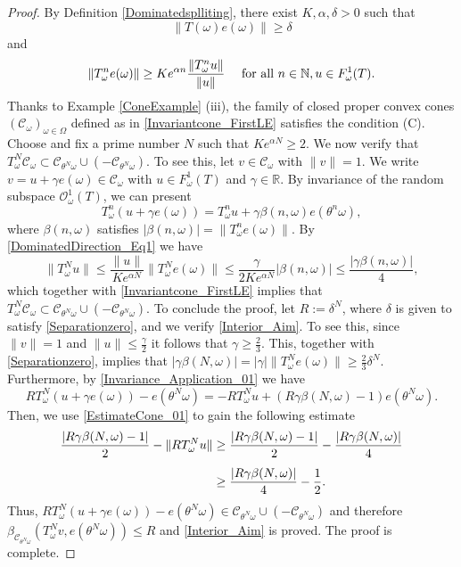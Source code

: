 \documentclass[pdflatex,sn-mathphys-num]{sn-jnl}%
\theoremstyle{thmstyleone}%
\theoremstyle{thmstyletwo}%
\theoremstyle{thmstylethree}%
\newcommand{\N}{\mathbb{N}}
\newcommand{\R}{\mathbb{R}}
\newcommand{\cC}{\mathcal{C}}
\numberwithin{equation}{section}
\begin{document}
\begin{proof}
By Definition \ref{Dominatedsplliting}, there exist $K,\alpha,\delta>0$ such that 
\begin{equation}\label{Separationzero}
\|T(\omega)e(\omega)\|\geq \delta 
\end{equation}
and 
\begin{equation}\label{DominatedDirection_Eq1}
\|T^n_{\omega}e(\omega)\|\geq   Ke^{\alpha n}  \frac{\|T_{\omega}^n u\|}{\|u\|} \quad \hbox{ for all } n\in\N, u\in F^1_{\omega}(T).
\end{equation}
%
%
Thanks to Example \eqref{ConeExample} (iii), the family of closed proper convex cones $(\cC_{\omega})_{\omega\in\Omega}$ defined as in \eqref{Invariantcone_FirstLE} satisfies the condition (C). Choose and fix a prime number $N$ such that $Ke^{\alpha N}\geq 2 $. We now verify that $T^N_{\omega}\mathcal C_{\omega}\subset \mathcal C_{\theta^N \omega}\cup (-\mathcal C_{\theta^N\omega})$. To see this,  let $v\in \cC_{\omega}$ with $\|v\|=1$. We write $v=u+\gamma e(\omega)\in\cC_{\omega}$ with $u\in F^1_{\omega}(T)$  and $\gamma\in\R$. By invariance of the random subspace $\mathcal O^1_{\omega}(T)$, we can present 
\begin{equation}\label{Invariance_Application_01}
T^n_{\omega}(u+\gamma e(\omega))
=T^n_{\omega} u + \gamma \beta(n,\omega) e(\theta^n\omega),
\end{equation}
where $\beta(n,\omega)$ satisfies $|\beta(n,\omega)|=\|T^n_{\omega}e(\omega)\|$. By \eqref{DominatedDirection_Eq1} we have 
\begin{equation}\label{EstimateCone_01}
\|T^N_{\omega} u\| \leq \frac{\|u\|}{Ke^{\alpha N}}\|T^N_{\omega}e(\omega)\|
\leq 
\frac{\gamma}{2Ke^{\alpha N}}|\beta(n,\omega)|\leq \frac{|\gamma \beta(n,\omega)|}{4},
\end{equation}
which together with \eqref{Invariantcone_FirstLE} implies that $T^N_{\omega}\cC_{\omega} \subset \mathcal C_{\theta^N \omega}\cup (-\mathcal C_{\theta^N\omega})$. To conclude the proof, let $R:=\delta^N$, where $\delta$ is given to satisfy \eqref{Separationzero},  and we verify \eqref{Interior_Aim}. To see this, since  $\|v\|=1$ and $\|u\|\leq \frac{\gamma}{2}$ it follows that $\gamma\geq \frac{2}{3}$. This, together with \eqref{Separationzero}, implies that 
$|\gamma \beta(N,\omega)|=|\gamma|\|T^N_{\omega}e(\omega)\|\geq \frac{2}{3}\delta^N$. Furthermore, by \eqref{Invariance_Application_01} we have 
\[
R T^N_{\omega}(u+\gamma e(\omega))-e(\theta^N\omega)
= -R T^N_{\omega}u+ (R\gamma\beta(N,\omega)-1)e(\theta^N\omega).
\]
Then,  we use \eqref{EstimateCone_01} to gain the following estimate
\begin{align}
\frac{|R\gamma\beta(N,\omega)-1|}{2} -\|R T^N_{\omega}u\|
& \geq 
\frac{|R\gamma\beta(N,\omega)-1|}{2} -\frac{|R\gamma\beta(N,\omega)|}{4}\notag\\[1ex]
& \geq 
\frac{|R\gamma\beta(N,\omega)|}{4}-\frac{1}{2}.\notag
\end{align}
Thus, $R T^N_{\omega}(u+\gamma e(\omega))-e(\theta^N\omega)
\in  \mathcal C_{\theta^N \omega}\cup (-\mathcal C_{\theta^N\omega})$ and therefore $\beta_{\mathcal C_{\theta^N\omega}}(T^N_{\omega}v, e(\theta^N\omega))\leq R$ and \eqref{Interior_Aim} is proved. The proof is complete.
\end{proof}
%
\end{document}
